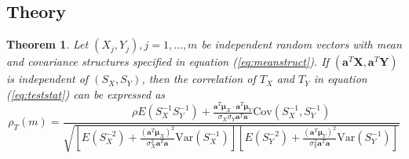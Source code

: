 \documentclass[review]{elsarticle}
\newtheorem{theorem}{Theorem}       %
\newcommand{\cov}{\text{Cov}}
\newcommand{\var}{\text{Var}}
\begin{document}
	\subsection{Theory}
	\begin{theorem}\label{thm:teststatcor}
		Let $(X_j, Y_j), j = 1, \ldots, m$ be independent random vectors with mean and covariance 
		structures specified in equation (\ref{eq:meanstruct}). If $(\bm a^T\bm X, \bm a^T\bm Y)$ 
		is independent of $(S_X, S_Y)$, then the correlation of $T_X$ and $T_Y$ in equation 
		(\ref{eq:teststat}) can be expressed as 
		\begin{equation}\label{eq:teststatcor}
		\rho_T(m) = \frac{ \rho E(S_X^{-1}S_Y^{-1}) + \frac{\bm a^T\bm \mu_X\cdot \bm a^T\bm 
				\mu_Y}{\sigma_X\sigma_Y\bm a^T\bm a}\cov(S_X^{-1}, S_Y^{-1}) 
		}{\sqrt{\left[E(S_X^{-2}) 
			+ \frac{(\bm a^T\bm \mu_X)^2}{\sigma_X^2\bm a^T\bm 
				a}\var(S_X^{-1})\right]\left[E(S_Y^{-2}) + \frac{(\bm a^T\bm 
				\mu_Y)^2}{\sigma_Y^2\bm 
				a^T\bm a}\var(S_Y^{-1})\right]}}
	\end{equation}
	\end{theorem}
	
\end{document}
